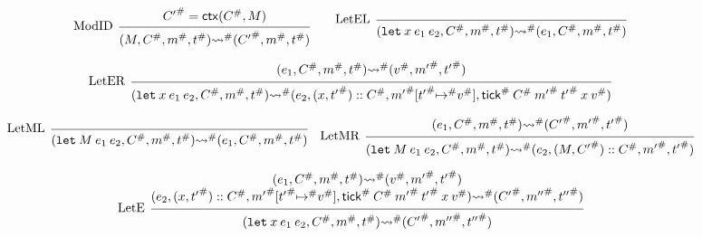 \documentclass[acmsmall,review]{acmart}\settopmatter{printfolios=true,printccs=false,printacmref=false}
\theoremstyle{definition}
\newcommand*{\cons}{::}
\newcommand*{\A}[1]{{#1}^{\#}}
\newcommand*{\mem}{m}
\newcommand*{\tick}{\mathsf{tick}}
\newcommand*{\modctx}{\mathsf{ctx}}
\begin{document}
\begin{figure}[h!]
  \[
    \begin{prooftree}
      \hypo{\A{C'}=\modctx(\A{C},M)}
      \infer[left label=ModID]1{
      (M, \A{C}, \A\mem, \A{t})
      \A\rightsquigarrow
      (\A{C'}, \A\mem, \A{t})
      }
    \end{prooftree}\qquad
    \begin{prooftree}
      \infer[left label=LetEL]0{
      (\mathtt{let}\:x\:e_1\:e_2, \A{C}, \A\mem, \A{t})
      \A\rightsquigarrow
      (e_{1}, \A{C}, \A\mem, \A{t})
      }
    \end{prooftree}
  \]

  \[
    \begin{prooftree}
      \hypo{
        \begin{matrix}
          (e_{1}, \A{C}, \A\mem, \A{t})
          \A\rightsquigarrow
          (\A{v}, \A{\mem'}, \A{t'})
        \end{matrix}
      }
      \infer[left label=LetER]1{
      (\mathtt{let}\:x\:e_1\:e_2, \A{C}, \A\mem, \A{t})
      \A\rightsquigarrow
      (e_{2}, (x, \A{t'})\cons \A{C}, \A{\mem'}[\A{t'}\A\mapsto \A{v}], \A\tick\:\A{C}\:\A{\mem'}\:\A{t'}\:x\:\A{v})
      }
    \end{prooftree}
  \]

  \[
    \begin{prooftree}
      \infer[left label=LetML]0{
      (\mathtt{let}\:M\:e_{1}\:e_{2}, \A{C}, \A\mem, \A{t})
      \A\rightsquigarrow
      (e_{1}, \A{C}, \A\mem, \A{t})
      }
    \end{prooftree}\quad
    \begin{prooftree}
      \hypo{
        \begin{matrix}
          (e_{1}, \A{C}, \A\mem, \A{t})
          \A\rightsquigarrow
          (\A{C'}, \A{\mem'}, \A{t'})
        \end{matrix}
      }
      \infer[left label=LetMR]1{
      (\mathtt{let}\:M\:e_{1}\:e_{2}, \A{C}, \A\mem, \A{t})
      \A\rightsquigarrow
      (e_{2}, (M, \A{C'})\cons \A{C}, \A{\mem'}, \A{t'})
      }
    \end{prooftree}
  \]

  \[
    \begin{prooftree}
      \hypo{
        \begin{matrix}
          (e_{1}, \A{C}, \A\mem, \A{t})
          \A\rightsquigarrow
          (\A{v}, \A{\mem'}, \A{t'}) \\
          (e_{2}, (x, \A{t'})\cons \A{C}, \A{\mem'}[\A{t'}\A\mapsto \A{v}], \A\tick\:\A{C}\:\A{\mem'}\:\A{t'}\:x\:\A{v})
          \A\rightsquigarrow
          (\A{C'}, \A{\mem''}, \A{t''})
        \end{matrix}
      }
      \infer[left label=LetE]1{
      (\mathtt{let}\:x\:e_1\:e_2, \A{C}, \A\mem, \A{t})
      \A\rightsquigarrow
      (\A{C'}, \A{\mem''}, \A{t''})
      }
    \end{prooftree}
  \]


\end{figure}
\end{document}
